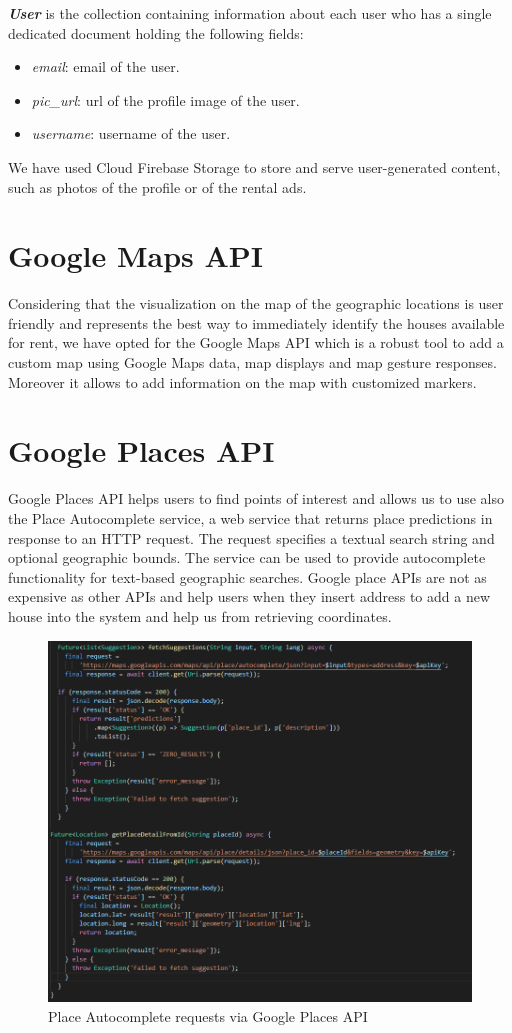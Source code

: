 \textbf{\textit{User}} is the collection containing information about each user who has a single dedicated document holding the following fields:
\begin{itemize}
    \item \textit{email}: email of the user.
    \item \textit{pic\_url}: url of the profile image of the user.
    \item \textit{username}: username of the user.\\
\end{itemize}

 We have used Cloud Firebase Storage to store and serve user-generated content, such as photos of the profile or of the rental ads.\\


\section{Google Maps API}
Considering that the visualization on the map of the geographic locations is user friendly and represents the best way to immediately identify the houses available for rent, we have opted for the Google Maps API which is a robust tool to add a custom map using Google Maps data, map displays and map gesture responses. Moreover it allows to add information on the map with customized markers. \\

\section{Google Places API}
Google Places API helps users to find points of interest and allows us to use also the Place Autocomplete service, a web service that returns place predictions in response to an HTTP request. The request specifies a textual search string and optional geographic bounds. The service can be used to provide autocomplete functionality for text-based geographic searches.
Google place APIs are not as expensive as other APIs and help users when they insert address to add a new house into the system and help us from retrieving coordinates. 

\begin{figure}[h]
    \centering
    \includegraphics[width=\textwidth]{images/placesrequest.png}
    \caption{Place Autocomplete requests via Google Places API}
\end{figure}